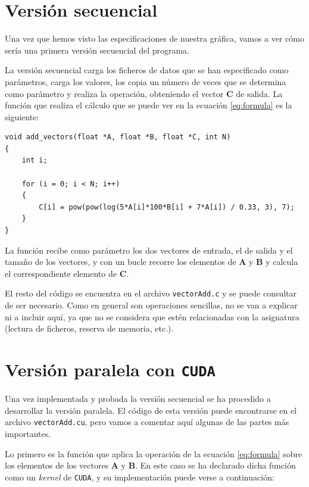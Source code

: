 \documentclass[11pt,a4paper]{article}
\renewcommand{\vec}[1]{\mathbf{#1}}
\begin{document}

\section{Versión secuencial}

Una vez que hemos visto las especificaciones de nuestra gráfica, vamos a ver cómo sería
una primera versión secuencial del programa.

La versión secuencial carga los ficheros de datos que se han especificado como parámetros,
carga los valores, los copia un número de veces que se determina como parámetro y realiza
la operación, obteniendo el vector $\vec{C}$ de salida. La función que realiza el cálculo
que se puede ver en la ecuación \eqref{eq:formula} es la siguiente:

\begin{lstlisting}
void add_vectors(float *A, float *B, float *C, int N)
{
    int i;

    for (i = 0; i < N; i++)
    {
        C[i] = pow(pow(log(5*A[i]*100*B[i] + 7*A[i]) / 0.33, 3), 7);
    }
}
\end{lstlisting}

La función recibe como parámetro los dos vectores de entrada, el de salida y el
tamaño de los vectores, y con un bucle recorre los elementos de $\vec{A}$ y $\vec{B}$
y calcula el correspondiente elemento de $\vec{C}$.

El resto del código se encuentra en el archivo \texttt{vectorAdd.c} y se puede consultar
de ser necesario. Como en general son operaciones sencillas, no se van a explicar ni a incluir
aquí, ya que no se considera que estén relacionadas con la asignatura (lectura de ficheros,
reserva de memoria, etc.).

\section{Versión paralela con \texttt{CUDA}}

Una vez implementada y probada la versión secuencial se ha procedido a desarrollar
la versión paralela. El código de esta versión puede encontrarse en el archivo
\texttt{vectorAdd.cu}, pero vamos a comentar aquí algunas de las partes
más importantes.

Lo primero es la función que aplica la operación de la ecuación \eqref{eq:formula}
sobre los elementos de los vectores $\vec{A}$ y $\vec{B}$. En este caso se
ha declarado dicha función como un \textit{kernel} de \texttt{CUDA}, y su implementación
puede verse a continuación:
\end{document}
